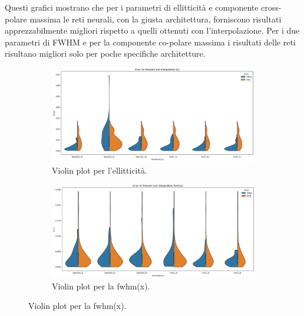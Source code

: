 \documentclass[12pt,a4paper,final]{book}
\begin{document}
Questi grafici mostrano che per i parametri di ellitticità e componente cross-polare massima le reti neurali, con la giusta architettura, forniscono risultati apprezzabilmente migliori rispetto a quelli ottenuti con l'interpolazione.
Per i due parametri di FWHM e per la componente co-polare massima i risultati delle reti risultano migliori solo per poche specifiche architetture.
\vspace{35mm}
\begin{figure}[!ht]
	\begin{center}
		\begin{subfigure}{\textwidth}
		    \centering
		    \includegraphics[width=\linewidth]{../figures/violin_plot_e.png}
		    \caption{Violin plot per l'ellitticità.}
		    \label{violin_e}
		\end{subfigure}
		\newline
		\begin{subfigure}{\textwidth}
		    \centering
		    \includegraphics[width=\linewidth]{../figures/violin_plot_fwhmx.png}
		    \caption{Violin plot per la fwhm(x).}
		    \label{violin_fwhmx}
		\end{subfigure}
	\end{center}
\end{figure}
\newpage
\end{document}
